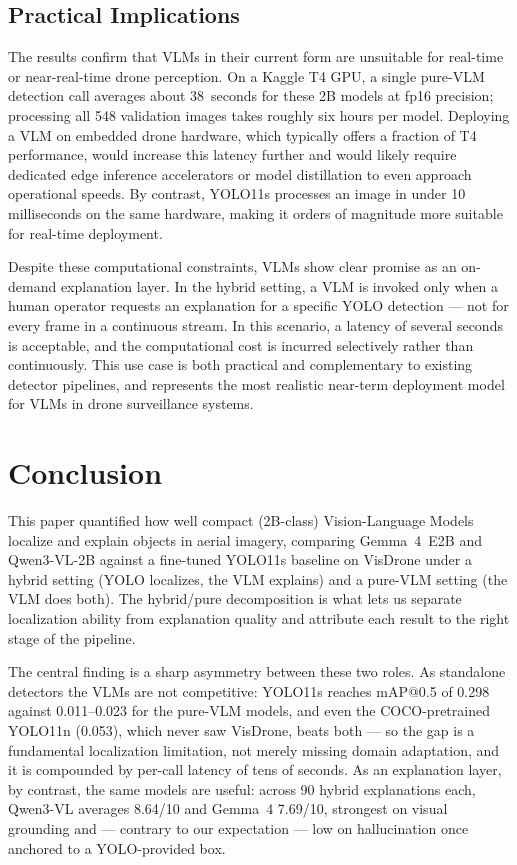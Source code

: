 \documentclass[acmtog, authorversion]{acmart}
\begin{document}
\subsection{Practical Implications}

The results confirm that VLMs in their current form are unsuitable
for real-time or near-real-time drone perception. On a Kaggle T4
GPU, a single pure-VLM detection call averages about 38~seconds for
these 2B models at fp16 precision; processing all 548 validation
images takes roughly six hours per model. Deploying a VLM
on embedded drone hardware, which typically offers a fraction of T4
performance, would increase this latency further and would likely
require dedicated edge inference accelerators or model distillation
to even approach operational speeds. By contrast, YOLO11s processes
an image in under 10 milliseconds on the same hardware, making it
orders of magnitude more suitable for real-time deployment.

Despite these computational constraints, VLMs show clear promise as
an on-demand explanation layer. In the hybrid setting, a VLM is
invoked only when a human operator requests an explanation for a
specific YOLO detection --- not for every frame in a continuous
stream. In this scenario, a latency of several seconds is acceptable,
and the computational cost is incurred selectively rather than
continuously. This use case is both practical and complementary to
existing detector pipelines, and represents the most realistic
near-term deployment model for VLMs in drone surveillance systems.

\section{Conclusion}
\label{sec:conclusion}

This paper quantified how well compact (2B-class) Vision-Language
Models localize and explain objects in aerial imagery, comparing
Gemma~4~E2B and Qwen3-VL-2B against a fine-tuned YOLO11s baseline on
VisDrone under a hybrid setting (YOLO localizes, the VLM explains) and a
pure-VLM setting (the VLM does both). The hybrid/pure decomposition is
what lets us separate localization ability from explanation quality and
attribute each result to the right stage of the pipeline.

The central finding is a sharp asymmetry between these two roles. As
standalone detectors the VLMs are not competitive: YOLO11s reaches
mAP@0.5 of 0.298 against 0.011--0.023 for the pure-VLM models, and even
the COCO-pretrained YOLO11n (0.053), which never saw VisDrone, beats
both --- so the gap is a fundamental localization limitation, not merely
missing domain adaptation, and it is compounded by per-call latency of
tens of seconds. As an explanation layer, by contrast, the same models
are useful: across 90 hybrid explanations each, Qwen3-VL averages
8.64/10 and Gemma~4 7.69/10, strongest on visual grounding and ---
contrary to our expectation --- low on hallucination once anchored to a
YOLO-provided box.
\end{document}

